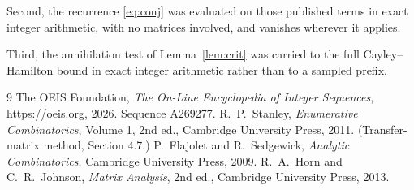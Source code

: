 \documentclass[11pt,a4paper]{article}
\theoremstyle{plain}
\theoremstyle{definition}
\begin{document}
Second, the recurrence \eqref{eq:conj} was evaluated on those published terms in exact
integer arithmetic, with no matrices involved, and vanishes wherever it applies.

Third, the annihilation test of Lemma~\ref{lem:crit} was carried to the full
Cayley--Hamilton bound in exact integer arithmetic rather than to a sampled prefix.

\begin{thebibliography}{9}
 The OEIS Foundation, \emph{The On-Line Encyclopedia of Integer
Sequences}, \url{https://oeis.org}, 2026. Sequence A269277.
 R.~P.~Stanley, \emph{Enumerative Combinatorics}, Volume 1, 2nd ed.,
Cambridge University Press, 2011. (Transfer-matrix method, Section 4.7.)
 P.~Flajolet and R.~Sedgewick, \emph{Analytic Combinatorics}, Cambridge
University Press, 2009.
 R.~A.~Horn and C.~R.~Johnson, \emph{Matrix Analysis}, 2nd ed., Cambridge
University Press, 2013.
\end{thebibliography}
\end{document}
